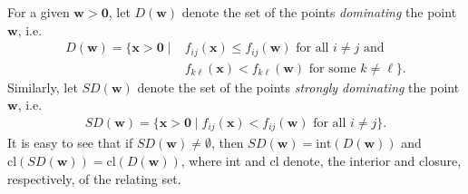 \documentclass{article}
\theoremstyle{plain}
\begin{document}
For a given $\mathbf{w}>\mathbf{0}$, let $D(\mathbf{w})$ denote the set of the points \textit{dominating} the point $\mathbf{w}$, i.e.
\begin{align}
D(\mathbf{w}) = \{\mathbf{x}>\mathbf{0}\mid &
f_{ij}(\mathbf{x})\le f_{ij}(\mathbf{w})\text{ for all } i\ne j \text{ and }\nonumber\\
&f_{k\ell}(\mathbf{x})< f_{k\ell}(\mathbf{w})\text{ for some } k\ne \ell \}.
\nonumber
\end{align}
Similarly, let $SD(\mathbf{w})$ denote the set of the points \textit{strongly dominating} the point $\mathbf{w}$, i.e.
\begin{align}
SD(\mathbf{w}) = \{\mathbf{x}>\mathbf{0}\mid
f_{ij}(\mathbf{x}) < f_{ij}(\mathbf{w})\text{ for all } i\ne j  \}.
\nonumber
\end{align}
It is easy to see that if $SD(\mathbf{w})\ne\emptyset$, then $SD(\mathbf{w}) =\text{int}(D(\mathbf{w}))$ and $\text{cl}(SD(\mathbf{w})) =\text{cl}(D(\mathbf{w}))$, where int and cl denote, the interior and closure, respectively, of the relating set.
\end{document}
